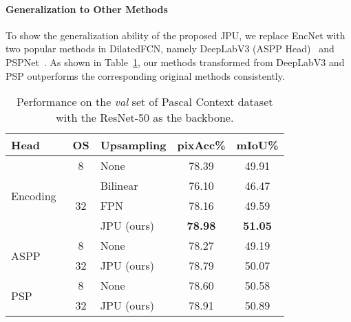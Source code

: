 \documentclass[10pt,twocolumn,letterpaper]{article}
\begin{document}
\paragraph{Generalization to Other Methods}
To show the generalization ability of the proposed JPU, we replace EncNet with two popular methods in DilatedFCN, namely DeepLabV3 (ASPP Head)~\cite{chen2017rethinking} and PSPNet~\cite{zhao2017pyramid}.
As shown in Table~\ref{table:ablation}, our methods transformed from DeepLabV3 and PSP outperforms the corresponding original methods consistently.
\begin{table}
\begin{center}
\begin{tabular}{l|c|l|cc}
\hline
Head & OS & Upsampling & pixAcc\% & mIoU\% \\
\hline
\hline
\multirow{4}{*}{Encoding~\cite{zhang2018context}} & 8 & None & 78.39 & 49.91\\
\cline{2-2}
 & \multirow{3}{*}{32} & Bilinear & 76.10 & 46.47\\
 &  & FPN~\cite{lin2017feature} & 78.16 & 49.59\\
 &  & JPU (ours) & \cellcolor{First}\textbf{78.98} & \cellcolor{First}\textbf{51.05}\\
\hline
\multirow{2}{*}{ASPP~\cite{chen2017rethinking}} & 8 & None & 78.27 & 49.19\\
 & 32 & JPU (ours) & \cellcolor{Third}78.79 & 50.07\\
\hline
\multirow{2}{*}{PSP~\cite{zhao2017pyramid}} & 8 & None & 78.60 & \cellcolor{Third}50.58\\
 & 32 & JPU (ours) & \cellcolor{Second}78.91 & \cellcolor{Second}50.89\\
\hline
\end{tabular}
\end{center}
	\caption{Performance on the \textit{val} set of Pascal Context dataset with the ResNet-50 as the backbone.}
	\label{table:ablation}
\end{table}
\end{document}
